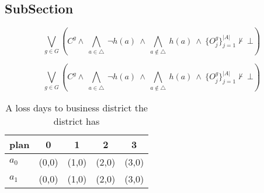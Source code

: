 \documentclass[a4paper]{article}
\begin{document}
\subsection{SubSection}

\[\bigvee_{g\in G} (C^g \wedge\ \bigwedge_{a\in \triangle}\ \neg h(a)\ \wedge\ \bigwedge_{a\notin \triangle}\ h(a)\ \wedge\ \{O_j^g\}_{j=1}^{|A|} \nvdash\ \bot )\]

\[\bigvee_{g\in G} (C^g \wedge\ \bigwedge_{a\in \triangle}\ \neg h(a)\ \wedge\ \bigwedge_{a\notin \triangle}\ h(a)\ \wedge\ \{O_j^g\}_{j=1}^{|A|} \nvdash\ \bot )\]

\begin{table}
\begin{adjustbox}{width=0.7\columnwidth}
\begin{tabular}{|l|l|l|l|l|}
\hline
\textbf{plan} & \multicolumn{1}{c|}{\textbf{0}} & \multicolumn{1}{c|}{\textbf{1}} & \multicolumn{1}{c|}{\textbf{2}} & \multicolumn{1}{c|}{\textbf{3}} \\ \hline
\textbf{$a_0$}  & (0,0) & (1,0) & (2,0) & (3,0) \\ \hline
\textbf{$a_1$}  & (0,0) & (1,0) & (2,0) & (3,0) \\ \hline
\end{tabular}
\end{adjustbox}
\caption{A loss days to business district the district has
}
\end{table}
\end{document}
